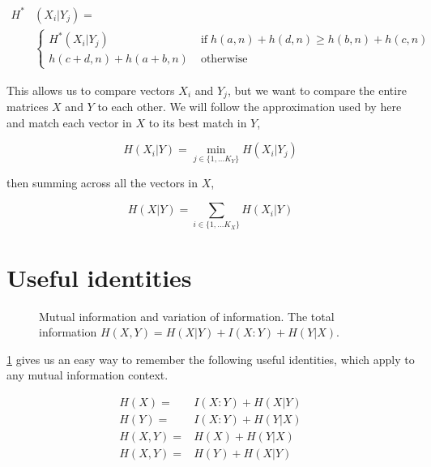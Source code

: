 \documentclass[9pt,technote]{IEEEtran}
\begin{document}
\begin{equation}
	\begin{split}
	H^* & (X_i | Y_j) = \\
	& \left\{
		\begin{split}
			H^*(X_i | Y_j) \; & \mbox{if} \; h(a,n) + h(d,n) \geq h(b,n) + h(c,n) \\
			h(c+d,n)+h(a+b,n) \;  & \mbox{otherwise}
		\end{split}
	\right.
	\end{split}
\end{equation}

This allows us to compare vectors $X_i$ and $Y_j$, but we want to compare the entire matrices
$X$ and $Y$ to each other. We will follow the approximation used by \lfk here and
match each vector in $X$ to its best match in $Y$,

\begin{equation}
	H(X_i | Y) = \underset{j \in \{1,\dots K_Y \}}{\min} H(X_i | Y_j)
	\label{eqnBestMatch}
\end{equation}

then summing across all the vectors in $X$,

\begin{equation}
	H(X | Y) = \sum_{i \in \{1,\dots K_X \}} H(X_i | Y)
\end{equation}

\section{Useful identities}

\begin{figure}
	\centering
{}
\caption{\label{figVenn} Mutual information and variation of information. The total information $H(X,Y) = H(X|Y) + I(X:Y) + H(Y|X)$. }
\end{figure}


\cref{figVenn} gives us an easy way to remember the following useful identities, which
apply to any mutual information context.

\begin{align}
	H(X) = & I(X:Y) + H(X|Y) \\
	H(Y) = & I(X:Y) + H(Y|X) \\
	H(X,Y) = & H(X) + H(Y|X) \\
	H(X,Y) = & H(Y) + H(X|Y)
\end{align}
\end{document}

